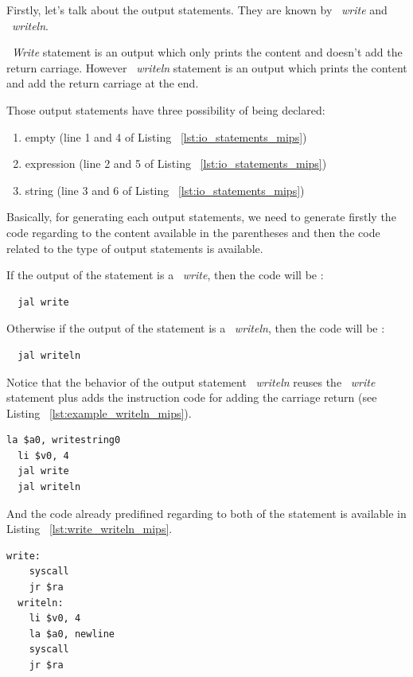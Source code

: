 \documentclass[
  oneside,
  11pt, a4paper,
  footinclude=true,
  headinclude=true,
  cleardoublepage=empty
]{scrbook}
\begin{document}
Firstly, let's talk about the output statements. They are known by ~\textit{write} and ~\textit{writeln}.

~\textit{Write} statement is an output which only prints the content and doesn't add the return carriage. However ~\textit{writeln} statement is an output which prints the content and add the return carriage at the end.

Those output statements have three possibility of being declared:

\begin{enumerate}
\item empty (line 1 and 4 of Listing ~\ref{lst:io_statements_mips})
\item expression (line 2 and 5 of Listing ~\ref{lst:io_statements_mips})
\item string (line 3 and 6 of Listing ~\ref{lst:io_statements_mips})
\end{enumerate}

Basically, for generating each output statements, we need to generate firstly the code regarding to the content available in the parentheses and then the code related to the type of output statements is available.

If the output of the statement is a ~\textit{write}, then the code will be :

\begin{lstlisting}
  jal write
\end{lstlisting}

Otherwise if the output of the statement is a ~\textit{writeln}, then the code will be :

\begin{lstlisting}	
  jal writeln
\end{lstlisting}

Notice that the behavior of the output statement ~\textit{writeln} reuses the ~\textit{write} statement plus adds the instruction code for adding the carriage return (see Listing ~\ref{lst:example_writeln_mips}).

\begin{lstlisting}[caption={Code generated for line 6 in Listing ~\ref{lst:io_statements_mips}},label={lst:example_writeln_mips}]
  la $a0, writestring0
  li $v0, 4
  jal write	
  jal writeln
\end{lstlisting}

And the code already predifined regarding to both of the statement is available in Listing ~\ref{lst:write_writeln_mips}.

\begin{lstlisting}[caption={MIPS assembly code of write and writeln},label={lst:write_writeln_mips}]
  write: 
	syscall
	jr $ra
  writeln: 
	li $v0, 4
	la $a0, newline
	syscall
	jr $ra
\end{lstlisting}
\end{document}
